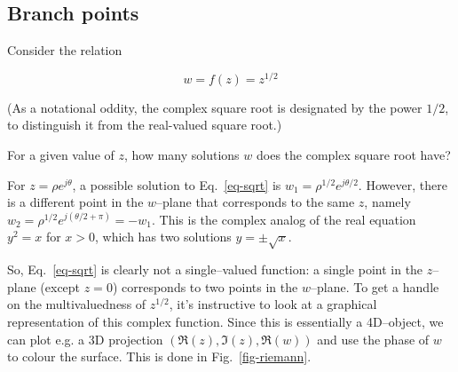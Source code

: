 \pagebreak

\subsection*{Branch points}

Consider the relation

\begin{equation}
w = f(z) = z^{1/2} \label{eq-sqrt}
\end{equation}

(As a notational oddity, the complex square root is designated by the power $1/2$, to distinguish it from the real-valued square root.)

\begin{cue}
For a given value of $z$, how many solutions $w$ does the complex square root have? 
\end{cue}

For $z=\rho e^{j\theta}$, a possible solution to Eq.~\ref{eq-sqrt} is $w_1 = \rho^{1/2} e^{j\theta/2}$. However, there is a different point in the $w$--plane that corresponds to the same $z$, namely $w_2 = \rho^{1/2} e^{j(\theta/2+\pi)} = -w_1$. This is the complex analog of the real equation $y^2 = x$ for $x > 0$, which has two solutions $y = \pm \sqrt{x}$.

So, Eq.~\ref{eq-sqrt} is clearly not a single--valued function: a single point in the $z$--plane (except $z=0$) corresponds to two points in the $w$--plane. To get a handle on the multivaluedness of $z^{1/2}$, it's instructive to look at a graphical representation of this complex function. Since this is essentially a 4D--object, we can plot e.g. a 3D projection $(\Re(z),\Im(z),\Re(w))$ and use the phase of $w$ to colour the surface. This is done in Fig.~\ref{fig-riemann}.

